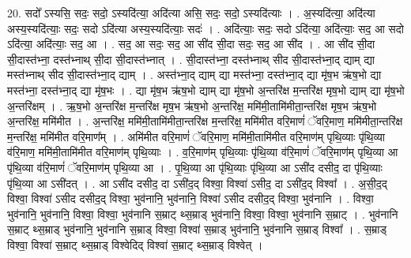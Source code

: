 \documentclass[17pt]{extarticle}
\begin{document}
20. सदो᳚ ऽस्यसि॒ सदः॒ सदो॒ ऽस्यदि॑त्या॒ अदि॑त्या असि॒ सदः॒ सदो॒ ऽस्यदि॑त्याः । . अ॒स्यदि॑त्या॒ अदि॑त्या अस्य॒स्यदि॑त्याः॒ सदः॒ सदो ऽदि॑त्या अस्य॒स्यदि॑त्याः॒ सदः॑ । . अदि॑त्याः॒ सदः॒ सदो ऽदि॑त्या॒ अदि॑त्याः॒ सद॒ आ सदो ऽदि॑त्या॒ अदि॑त्याः॒ सद॒ आ । . सद॒ आ सदः॒ सद॒ आ सी॑द सी॒दा सदः॒ सद॒ आ सी॑द । . आ सी॑द सी॒दा सी॒दास्त॑भ्ना॒ दस्त॑भ्नाथ् सी॒दा सी॒दास्त॑भ्नात् । . सी॒दास्त॑भ्ना॒ दस्त॑भ्नाथ् सीद सी॒दास्त॑भ्ना॒द् द्याम् द्या मस्त॑भ्नाथ् सीद सी॒दास्त॑भ्ना॒द् द्याम् । . अस्त॑भ्ना॒द् द्याम् द्या मस्त॑भ्ना॒ दस्त॑भ्ना॒द् द्या मृ॑ष॒भ ऋ॑ष॒भो द्या मस्त॑भ्ना॒ दस्त॑भ्ना॒द् द्या मृ॑ष॒भः । . द्या मृ॑ष॒भ ऋ॑ष॒भो द्याम् द्या मृ॑ष॒भो अ॒न्तरि॑क्ष म॒न्तरि॑क्ष मृष॒भो द्याम् द्या मृ॑ष॒भो अ॒न्तरि॑क्षम् । . ऋ॒ष॒भो अ॒न्तरि॑क्ष म॒न्तरि॑क्ष मृष॒भ ऋ॑ष॒भो अ॒न्तरि॑क्ष॒ ममि॑मी॒तामि॑मीता॒न्तरि॑क्ष मृष॒भ ऋ॑ष॒भो अ॒न्तरि॑क्ष॒ ममि॑मीत । . अ॒न्तरि॑क्ष॒ ममि॑मी॒तामि॑मीता॒न्तरि॑क्ष म॒न्तरि॑क्ष॒ ममि॑मीत वरि॒माणं॑ ॅवरि॒माण॒ ममि॑मीता॒न्तरि॑क्ष म॒न्तरि॑क्ष॒ ममि॑मीत वरि॒माण᳚म् । . अमि॑मीत वरि॒माणं॑ ॅवरि॒माण॒ ममि॑मी॒तामि॑मीत वरि॒माण॑म् पृथि॒व्याः पृ॑थि॒व्या व॑रि॒माण॒ ममि॑मी॒तामि॑मीत वरि॒माण॑म् पृथि॒व्याः । . व॒रि॒माण॑म् पृथि॒व्याः पृ॑थि॒व्या व॑रि॒माणं॑ ॅवरि॒माण॑म् पृथि॒व्या आ पृ॑थि॒व्या व॑रि॒माणं॑ ॅवरि॒माण॑म् पृथि॒व्या आ । . पृ॒थि॒व्या आ पृ॑थि॒व्याः पृ॑थि॒व्या आ ऽसी॑द दसीद॒ दा पृ॑थि॒व्याः पृ॑थि॒व्या आ ऽसी॑दत् । . आ ऽसी॑द दसीद॒ दा ऽसी॑द॒द् विश्वा॒ विश्वा॑ ऽसीद॒ दा ऽसी॑द॒द् विश्वा᳚ । . अ॒सी॒द॒द् विश्वा॒ विश्वा॑ ऽसीद दसीद॒द् विश्वा॒ भुव॑नानि॒ भुव॑नानि॒ विश्वा॑ ऽसीद दसीद॒द् विश्वा॒ भुव॑नानि । . विश्वा॒ भुव॑नानि॒ भुव॑नानि॒ विश्वा॒ विश्वा॒ भुव॑नानि स॒म्राट् थ्स॒म्राड् भुव॑नानि॒ विश्वा॒ विश्वा॒ भुव॑नानि स॒म्राट् । . भुव॑नानि स॒म्राट् थ्स॒म्राड् भुव॑नानि॒ भुव॑नानि स॒म्राड् विश्वा॒ विश्वा॑ स॒म्राड् भुव॑नानि॒ भुव॑नानि स॒म्राड् विश्वा᳚ । . स॒म्राड् विश्वा॒ विश्वा॑ स॒म्राट् थ्स॒म्राड् विश्वेदिद् विश्वा॑ स॒म्राट् थ्स॒म्राड् विश्वेत् । \newline
\end{document}
